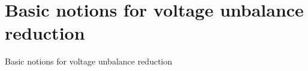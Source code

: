 \section{Basic notions for voltage unbalance reduction}

Basic notions for voltage unbalance reduction
%



%


